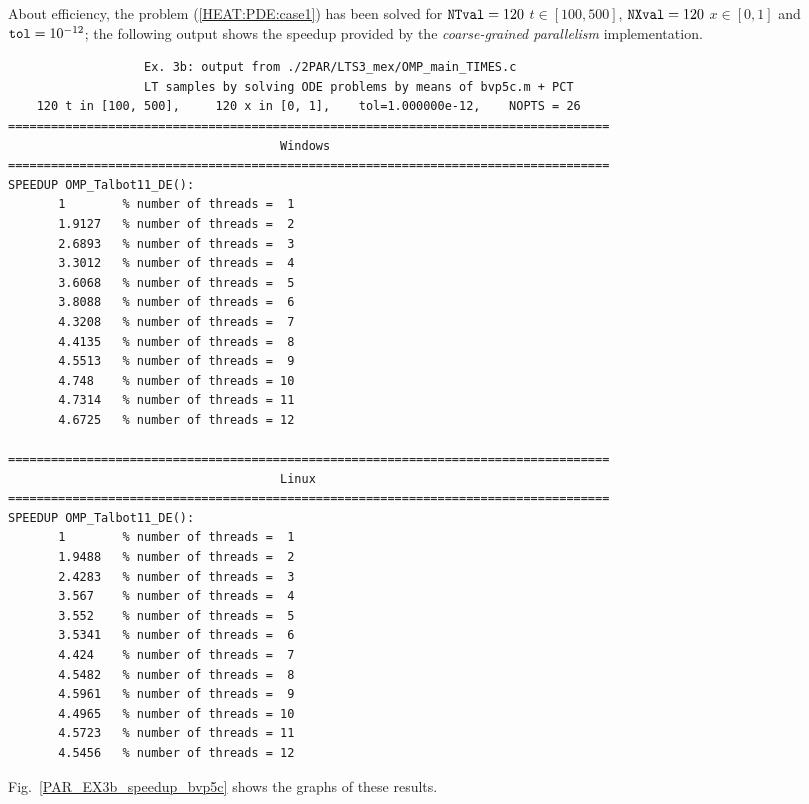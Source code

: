 \documentclass[a4paper,10pt]{report}%
\begin{document}
About efficiency, the problem (\ref{HEAT:PDE:case1}) has been solved for ${\tt NTval}=120$ $t\in[100, 500]$,
${\tt NXval}=120$ $x\in[0,1]$ and ${\tt tol}=10^{-12}$; the following output shows the speedup provided by the
{\em coarse-grained parallelism} implementation.
\begin{lstlisting}
                   Ex. 3b: output from ./2PAR/LTS3_mex/OMP_main_TIMES.c
                   LT samples by solving ODE problems by means of bvp5c.m + PCT
    120 t in [100, 500],     120 x in [0, 1],    tol=1.000000e-12,    NOPTS = 26
====================================================================================
                                      Windows
====================================================================================
SPEEDUP OMP_Talbot11_DE():
       1        % number of threads =  1
       1.9127   % number of threads =  2
       2.6893   % number of threads =  3
       3.3012   % number of threads =  4
       3.6068   % number of threads =  5
       3.8088   % number of threads =  6
       4.3208   % number of threads =  7
       4.4135   % number of threads =  8
       4.5513   % number of threads =  9
       4.748    % number of threads = 10
       4.7314   % number of threads = 11
       4.6725   % number of threads = 12

====================================================================================
                                      Linux
====================================================================================
SPEEDUP OMP_Talbot11_DE():
       1        % number of threads =  1
       1.9488   % number of threads =  2
       2.4283   % number of threads =  3
       3.567    % number of threads =  4
       3.552    % number of threads =  5
       3.5341   % number of threads =  6
       4.424    % number of threads =  7
       4.5482   % number of threads =  8
       4.5961   % number of threads =  9
       4.4965   % number of threads = 10
       4.5723   % number of threads = 11
       4.5456   % number of threads = 12
\end{lstlisting}
Fig.~\ref{PAR_EX3b_speedup_bvp5c} shows the graphs of these results.
\end{document}
